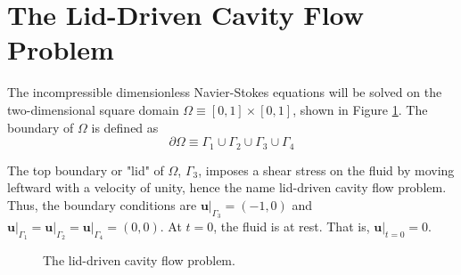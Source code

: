 \section{The Lid-Driven Cavity Flow Problem}

The incompressible dimensionless Navier-Stokes equations will be solved on the two-dimensional square domain $\Omega \equiv \left[ 0, 1 \right] \times \left[ 0, 1 \right]$, shown in Figure \ref{fig:problem}. The boundary of $\Omega$ is defined as 
\begin{equation}
    \partial \Omega \equiv \Gamma_1 \cup \Gamma_2 \cup \Gamma_3 \cup \Gamma_4 
\end{equation}

The top boundary or "lid" of $\Omega$, $\Gamma_3$, imposes a shear stress on the fluid by moving leftward with a velocity of unity, hence the name lid-driven cavity flow problem. Thus, the boundary conditions are $\left. \mathbf{u} \right|_{\Gamma_3} = (-1, 0)$ and $\left. \mathbf{u} \right|_{\Gamma_1} = \left. \mathbf{u} \right|_{\Gamma_2} = \left. \mathbf{u} \right|_{\Gamma_4} = (0, 0)$. At $t = 0$, the fluid is at rest. That is, $ \left. \mathbf{u} \right|_{t = 0} = 0$.

\begin{figure}[ht]
    \centering
    \caption{The lid-driven cavity flow problem.}
    \label{fig:problem}
\end{figure}
